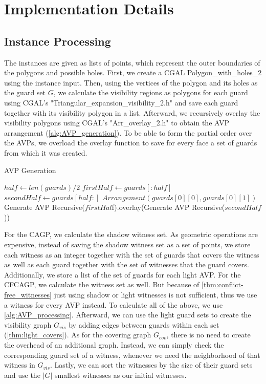\chapter{Implementation Details}

\section{Instance Processing}
The instances are given as lists of points, which represent the outer boundaries of the polygons and possible holes. First, we create a CGAL Polygon\_with\_holes\_2 using the instance input. Then, using the vertices of the polygon and its holes as the guard set $G$, we calculate the visibility regions as polygons for each guard using CGAL's "Triangular\_expansion\_visibility\_2.h" and save each guard together with its visibility polygon in a list. Afterward, we recursively overlay the visibility polygons using CGAL's "Arr\_overlay\_2.h" to obtain the AVP arrangement (\cref{alg:AVP_generation}). To be able to form the partial order over the AVPs, we overload the overlay function to save for every face a set of guards from which it was created. 

\begin{algorithm}
\caption{AVP Generation}\label{alg:AVP_generation}
\begin{algorithmic} 
\State $half\gets len(guards)/2$
\State $firstHalf\gets guards[:half]$ 
\State $secondHalf\gets guards[half:]$
    \State $Arrangement(guards[0][0], guards[0][1])$
\Else
    \State Generate AVP Recursive($firstHal$f).overlay(Generate AVP Recursive($secondHalf$))
\EndIf
\EndProcedure
\end{algorithmic}
\end{algorithm}

For the CAGP, we calculate the shadow witness set. As geometric operations are expensive, instead of saving the shadow witness set as a set of points, we store each witness as an integer together with the set of guards that covers the witness as well as each guard together with the set of witnesses that the guard covers. Additionally, we store a list of the set of guards for each light AVP. For the CFCAGP, we calculate the witness set as well. But because of \cref{thm:conflict-free_witnesses} just using shadow or light witnesses is not sufficient, thus we use a witness for every AVP instead. To calculate all of the above, we use \cref{alg:AVP_processing}. Afterward, we can use the light guard sets to create the visibility graph $G_{vis}$ by adding edges between guards within each set (\cref{thm:light_covers}). As for the covering graph $G_{cov}$, there is no need to create the overhead of an additional graph. Instead, we can simply check the corresponding guard set of a witness, whenever we need the neighborhood of that witness in $G_{vis}$. Lastly, we can sort the witnesses by the size of their guard sets and use the $|G|$ smallest witnesses as our initial witnesses.

